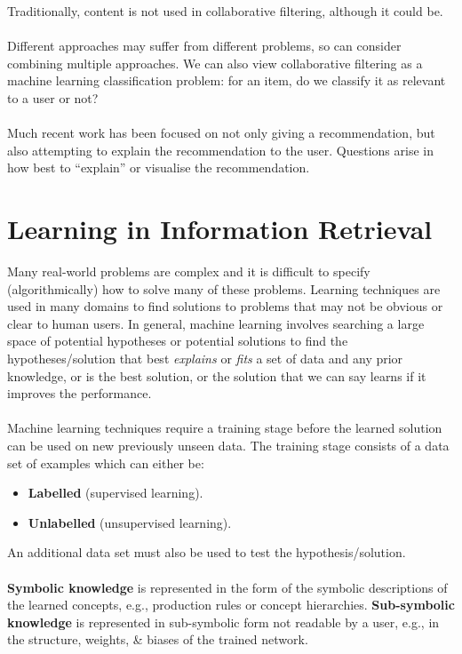 \documentclass[a4paper,11pt]{article}
\begin{document}
Traditionally, content is not used in collaborative filtering, although it could be.
\\\\
Different approaches may suffer from different problems, so can consider combining multiple approaches.
We can also view collaborative filtering as a machine learning classification problem: for an item, do we classify it as relevant to a user or not?
\\\\
Much recent work has been focused on not only giving a recommendation, but also attempting to explain the recommendation to the user.
Questions arise in how best to ``explain'' or visualise the recommendation.

\section{Learning in Information Retrieval}
Many real-world problems are complex and it is difficult to specify (algorithmically) how to solve many of these problems.
Learning techniques are used in many domains to find solutions to problems that may not be obvious or clear to human users.
In general, machine learning involves searching a large space of potential hypotheses or potential solutions to find the hypotheses/solution that best \textit{explains} or \textit{fits} a set of data and any prior knowledge, or is the best solution, or the solution that we can say learns if it improves the performance. 
\\\\
Machine learning techniques require a training stage before the learned solution can be used on new previously unseen data.
The training stage consists of a data set of examples which can either be:
\begin{itemize}
    \item   \textbf{Labelled} (supervised learning).
    \item   \textbf{Unlabelled} (unsupervised learning).
\end{itemize}

An additional data set must also be used to test the hypothesis/solution.
\\\\
\textbf{Symbolic knowledge} is represented in the form of the symbolic descriptions of the learned concepts, e.g., production rules or concept hierarchies.
\textbf{Sub-symbolic knowledge} is represented in sub-symbolic form not readable by a user, e.g., in the structure, weights, \& biases of the trained network.
\end{document}
